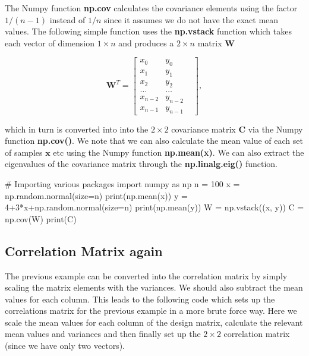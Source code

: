 \documentclass[%
oneside,                 %
final,                   %
10pt]{article}
\begin{document}
The Numpy function \textbf{np.cov} calculates the covariance elements using
the factor $1/(n-1)$ instead of $1/n$ since it assumes we do not have
the exact mean values.  The following simple function uses the
\textbf{np.vstack} function which takes each vector of dimension $1\times n$
and produces a $2\times n$ matrix $\bm{W}$

\[
\bm{W}^T = \begin{bmatrix} x_0 & y_0 \\
                          x_1 & y_1 \\
                          x_2 & y_2\\
                          \dots & \dots \\
                          x_{n-2} & y_{n-2}\\
                          x_{n-1} & y_{n-1} & 
             \end{bmatrix},
\]

which in turn is converted into into the $2\times 2$ covariance matrix
$\bm{C}$ via the Numpy function \textbf{np.cov()}. We note that we can also calculate
the mean value of each set of samples $\bm{x}$ etc using the Numpy
function \textbf{np.mean(x)}. We can also extract the eigenvalues of the
covariance matrix through the \textbf{np.linalg.eig()} function.












\bpycod
# Importing various packages
import numpy as np
n = 100
x = np.random.normal(size=n)
print(np.mean(x))
y = 4+3*x+np.random.normal(size=n)
print(np.mean(y))
W = np.vstack((x, y))
C = np.cov(W)
print(C)

\epycod


\subsection{Correlation Matrix again}

The previous example can be converted into the correlation matrix by
simply scaling the matrix elements with the variances.  We should also
subtract the mean values for each column. This leads to the following
code which sets up the correlations matrix for the previous example in
a more brute force way. Here we scale the mean values for each column of the design matrix, calculate the relevant mean values and variances and then finally set up the $2\times 2$ correlation matrix (since we have only two vectors). 
\end{document}
